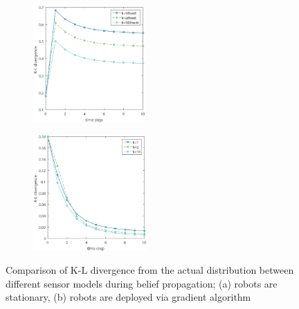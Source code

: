 \documentclass[journal]{IEEEtran}
\begin{document}
\begin{figure}
	\centering
	\begin{subfigure}[b]{0.23\textwidth}
		\centering
		\includegraphics[width=1.68in]{figure/kl_div_2}
		\caption{}
	\end{subfigure}
	\begin{subfigure}[b]{0.23\textwidth}
		\centering
		\includegraphics[width=1.7in]{figure/kl_div_1}
		\caption{}
	\end{subfigure}
	\caption{Comparison of K-L divergence from the actual distribution between different sensor models during belief propagation; (a) robots are stationary, (b) robots are deployed via gradient algorithm}
	\label{fig:fig5}
\end{figure}
\end{document}
